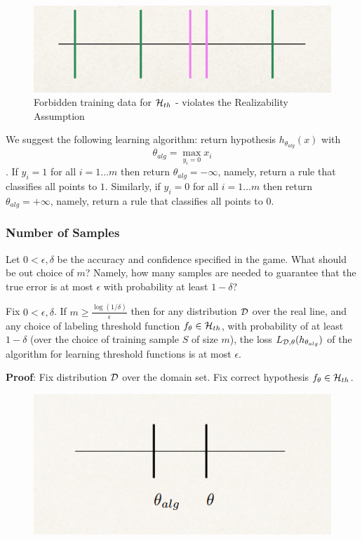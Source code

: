 {\begin{figure}[h!]
	\centering
	\includegraphics[scale=0.3]{chapters/pac/figures/thresholds2.png}
	\caption{Forbidden training data for $\mathcal{H}_{th}$ - violates the Realizability Assumption}
\end{figure}


We suggest the following learning algorithm: return hypothesis $h_{\theta_{alg}}(x)$ with $$\theta_{alg} = \max_{y_i=0} x_i$$.
If $y_i=1$ for all $i=1\ldots m$ then return $\theta_{alg} = -\infty$, namely, return a rule that classifies all points to $1$. Similarly, if $y_i=0$ for all $i=1\ldots m$ then return $\theta_{alg} = +\infty$, namely, return a rule that classifies all points to $0$.

\vspace{5mm}

\subsubsection*{Number of Samples}

Let $0<\epsilon,\delta$ be the accuracy and confidence specified in the game.
What should be out choice of $m$? Namely, how many samples are needed to guarantee that the true error is at most $\epsilon$ with probability at least $1-\delta$?

\begin{claim}
	Fix $0<\epsilon,\delta$.
	If $m \ge \frac{\log(1/\delta)}{\epsilon}$ then for any distribution $\mathcal{D}$ over the real line, and any choice of  labeling threshold function $f_\theta \in \mathcal{H}_{th}$,  with probability of at least $1-\delta$ (over the choice of training sample $S$ of size $m$), the loss
	$L_{\mathcal{D},\theta}(h_{\theta_{alg}})$
	of the algorithm for learning threshold functions is at most $\epsilon.$
\end{claim}

\textbf{Proof}:
Fix distribution $\mathcal{D}$ over the domain set. Fix correct hypothesis $f_{\theta}\in \mathcal{H}_{th}$.

\begin{figure}[h!]
	\centering
	\includegraphics[scale=0.3]{chapters/pac/figures/thresholds3.png}
\end{figure}


}

